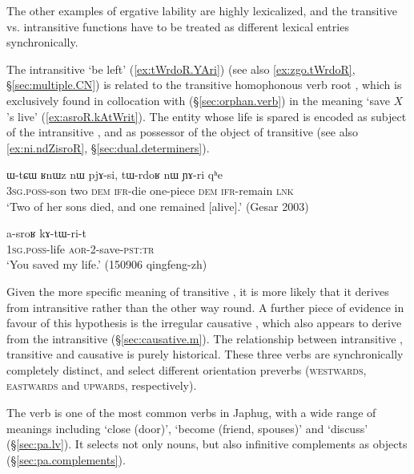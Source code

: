 The other examples of ergative lability are highly lexicalized, and the transitive vs. intransitive functions have to be treated as different lexical entries synchronically.

The intransitive  `be left' (\ref{ex:tWrdoR.YAri}) (see also \ref{ex:zgo.tWrdoR}, §\ref{sec:multiple.CN}) is related to the transitive homophonous verb root , which is exclusively found in collocation with  (§\ref{sec:orphan.verb}) in the meaning `save $X$'s live' (\ref{ex:asroR.kAtWrit}). The entity whose life is spared is encoded as subject of the intransitive , and as possessor of the object  of transitive  (see also \ref{ex:ni.ndZisroR}, §\ref{sec:dual.determiners}).

\begin{exe}
\ex \label{ex:tWrdoR.YAri}
 \gll  ɯ-tɕɯ ʁnɯz nɯ pjɤ-si, tɯ-rdoʁ nɯ ɲɤ-ri qʰe \\
 \textsc{3sg}.\textsc{poss}-son two \textsc{dem} \textsc{ifr}-die one-piece \textsc{dem} \textsc{ifr}-remain \textsc{lnk} \\
\glt `Two of her sons died, and one remained [alive].' (Gesar 2003)
\end{exe}

\begin{exe}
\ex \label{ex:asroR.kAtWrit}
 \gll a-sroʁ kɤ-tɯ-ri-t \\
\textsc{1sg}.\textsc{poss}-life \textsc{aor}-2-save-\textsc{pst}:\textsc{tr} \\
\glt `You saved my life.' (150906 qingfeng-zh) 
\end{exe}

Given the more specific meaning of transitive , it is more likely that it derives from intransitive  rather than the other way round. A further piece of evidence in favour of this hypothesis is the irregular causative , which also appears to derive from the intransitive  (§\ref{sec:causative.m}). The relationship between intransitive , transitive  and causative  is purely historical. These three verbs are synchronically completely distinct, and select different orientation preverbs (\textsc{westwards},  \textsc{eastwards} and  \textsc{upwards}, respectively).
 
The verb  is one of the most common verbs in Japhug, with a wide range of meanings including `close (door)', `become (friend, spouses)' and `discuss' (§\ref{sec:pa.lv}). It selects not only nouns, but also infinitive complements as objects (§\ref{sec:pa.complements}).
 
